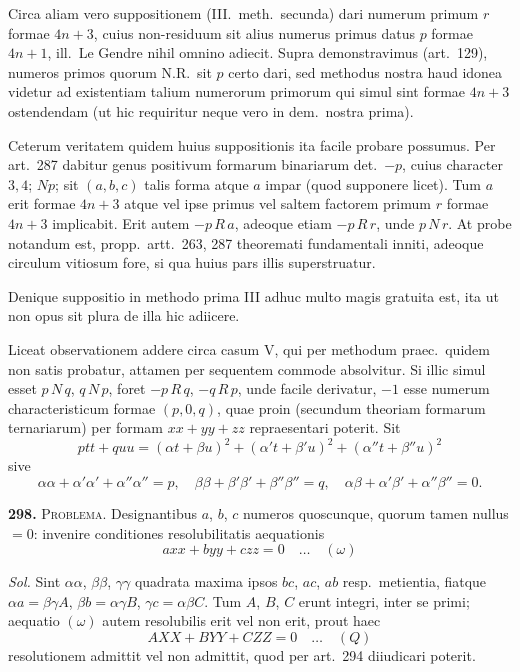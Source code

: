 \documentclass[12pt,a4paper]{article}
\theoremstyle{plain}
\theoremstyle{definition}
\theoremstyle{remark}
\begin{document}
Circa aliam vero suppositionem (III.~meth.~secunda) dari numerum primum $r$ formae $4n+3$, cuius non-residuum sit alius numerus primus datus $p$ formae $4n+1$, ill.~Le Gendre nihil omnino adiecit. Supra demonstravimus (art.~129), numeros primos quorum N.R.~sit $p$ certo dari, sed methodus nostra haud idonea videtur ad existentiam talium numerorum primorum qui simul sint formae $4n+3$ ostendendam (ut hic requiritur neque vero in dem.~nostra prima).

Ceterum veritatem quidem huius suppositionis ita facile probare possumus. Per art.~287 dabitur genus positivum formarum binariarum det.~$-p$, cuius character $3,4$; $Np$; sit $(a,b,c)$ talis forma atque $a$ impar (quod supponere licet). Tum $a$ erit formae $4n+3$ atque vel ipse primus vel saltem factorem primum $r$ formae $4n+3$ implicabit. Erit autem $-p \, R \, a$, adeoque etiam $-p \, R \, r$, unde $p \, N \, r$. At probe notandum est, propp.~artt.~263, 287 theoremati fundamentali inniti, adeoque circulum vitiosum fore, si qua huius pars illis superstruatur.

Denique suppositio in methodo prima III adhuc multo magis gratuita est, ita ut non opus sit plura de illa hic adiicere.

Liceat observationem addere circa casum V, qui per methodum praec.~quidem non satis probatur, attamen per sequentem commode absolvitur. Si illic simul esset $p \, N \, q$, $q \, N \, p$, foret $-p \, R \, q$, $-q \, R \, p$, unde facile derivatur, $-1$ esse numerum characteristicum formae $(p,0,q)$, quae proin (secundum theoriam formarum ternariarum) per formam $xx + yy + zz$ repraesentari poterit. Sit
\[
ptt + quu = (\alpha t + \beta u)^2 + (\alpha' t + \beta' u)^2 + (\alpha'' t + \beta'' u)^2
\]
sive
\[
\alpha\alpha + \alpha'\alpha' + \alpha''\alpha'' = p,\quad \beta\beta + \beta'\beta' + \beta''\beta'' = q,\quad \alpha\beta + \alpha'\beta' + \alpha''\beta'' = 0.
\]

\textbf{298.} \textsc{Problema.} Designantibus $a$, $b$, $c$ numeros quoscunque, quorum tamen nullus $= 0$: invenire conditiones resolubilitatis aequationis
\[
axx + byy + czz = 0 \quad\ldots\quad (\omega)
\]

\textit{Sol.} Sint $\alpha\alpha$, $\beta\beta$, $\gamma\gamma$ quadrata maxima ipsos $bc$, $ac$, $ab$ resp.~metientia, fiatque $\alpha a = \beta\gamma A$, $\beta b = \alpha\gamma B$, $\gamma c = \alpha\beta C$. Tum $A$, $B$, $C$ erunt integri, inter se primi; aequatio $(\omega)$ autem resolubilis erit vel non erit, prout haec
\[
AXX + BYY + CZZ = 0 \quad\ldots\quad (Q)
\]
resolutionem admittit vel non admittit, quod per art.~294 diiudicari poterit.
\end{document}
